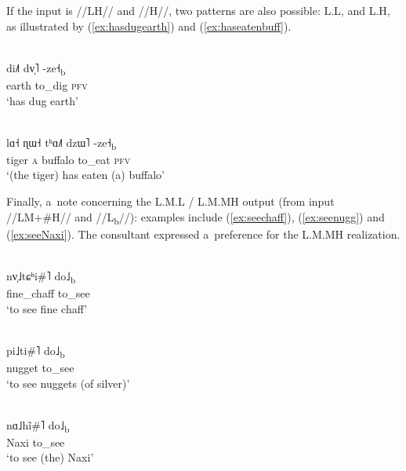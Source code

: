 If the input is \mbox{//LH//} and //H//, two patterns are also possible: L.L, and L.H, as illustrated by (\ref{ex:hasdugearth}) and (\ref{ex:haseatenbuff}).

\begin{exe}
	\ex
	\label{ex:hasdugearth}
	\\
	\gll di˩˥	dv̩˥		-ze˧\textsubscript{b}\\
	earth		to\_dig		\textsc{pfv}\\
	\glt ‘has dug earth’
\end{exe}

\begin{exe}
	\ex
	\label{ex:haseatenbuff}
	\\
	\gll lɑ˧	ɳɯ˧	tʰɑ˩˥	dzɯ˥		-ze˧\textsubscript{b}\\
	tiger		\textsc{a}	buffalo		to\_eat		\textsc{pfv}\\
	\glt ‘(the
	tiger) has eaten (a) buffalo’
\end{exe}

Finally, a~note concerning the L.M.L / L.M.MH output (from input //LM+\#H// and //L\textsubscript{b}//): examples include (\ref{ex:seechaff}), (\ref{ex:seenugg}) and (\ref{ex:seeNaxi}). The consultant
expressed a~preference for the L.M.MH realization.

\begin{exe}
	\ex
	\label{ex:seechaff}
	\\
	\gll nv̩˩tɕʰi\#˥ do˩\textsubscript{b}\\
	fine\_chaff		to\_see\\
	\glt ‘to see fine chaff’
\end{exe}

\begin{exe}
	\ex
	\label{ex:seenugg}
	\\
	\gll pi˩ti\#˥ do˩\textsubscript{b}\\
	nugget	to\_see\\
	\glt ‘to see nuggets (of silver)’
\end{exe}

\begin{exe}
	\ex
	\label{ex:seeNaxi}
	\\
	\gll nɑ˩hĩ\#˥ do˩\textsubscript{b}\\
	Naxi	to\_see\\
	\glt ‘to see (the) Naxi’
\end{exe}


